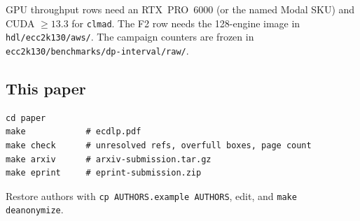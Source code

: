 GPU throughput rows need an RTX~PRO~6000 (or the named Modal SKU) and
CUDA ${}\ge 13.3$ for \texttt{clmad}. The F2 row needs the 128-engine
image in \texttt{hdl/ecc2k130/aws/}. The campaign counters are frozen
in \texttt{ecc2k130/benchmarks/dp-interval/raw/}.

\subsection{This paper}

\begin{verbatim}
cd paper
make            # ecdlp.pdf
make check      # unresolved refs, overfull boxes, page count
make arxiv      # arxiv-submission.tar.gz
make eprint     # eprint-submission.zip
\end{verbatim}

Restore authors with \texttt{cp AUTHORS.example AUTHORS}, edit, and
\texttt{make deanonymize}.
